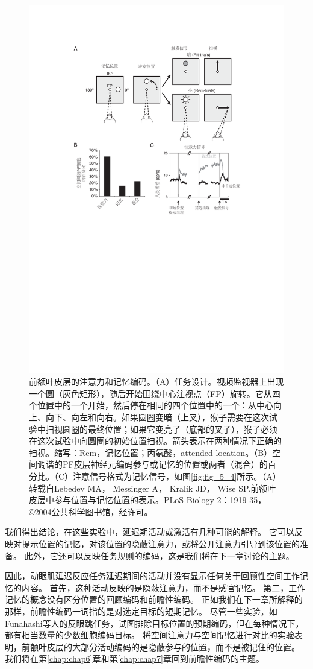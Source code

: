 \begin{figure}
	\centering
	\includegraphics[width=0.7\linewidth]{image_pfc/Fig_5_6}
	\caption{前额叶皮层的注意力和记忆编码。（A）任务设计。视频监视器上出现一个圆（灰色矩形），随后开始围绕中心注视点（FP）旋转。它从四个位置中的一个开始，然后停在相同的四个位置中的一个：从中心向上、向下、向左和向右。如果圆圈变暗（上叉），猴子需要在这次试验中扫视圆圈的最终位置；如果它变亮了（底部的叉子），猴子必须在这次试验中向圆圈的初始位置扫视。箭头表示在两种情况下正确的扫视。缩写：Rem，记忆位置；丙氨酸，attended-location。（B）空间调谐的PF皮层神经元编码参与或记忆的位置或两者（混合）的百分比。（C）注意信号格式为记忆信号，如图\ref{fig:fig_5_4}所示。（A）转载自Lebedev MA， Messinger A， Kralik JD， Wise SP.前额叶皮层中参与位置与记忆位置的表示。PLoS Biology 2：1919-35，©2004公共科学图书馆，经许可。}
	\label{fig:fig_5_6}
\end{figure}


我们得出结论，在这些实验中，延迟期活动或激活有几种可能的解释。
它可以反映对提示位置的记忆，对该位置的隐蔽注意力，或将公开注意力引导到该位置的准备。
此外，它还可以反映任务规则的编码，这是我们将在下一章讨论的主题。


因此，动眼肌延迟反应任务延迟期间的活动并没有显示任何关于回顾性空间工作记忆的内容。
首先，这种活动反映的是隐蔽注意力，而不是感官记忆。
第二，工作记忆的概念没有区分位置的回顾编码和前瞻性编码。
正如我们在下一章所解释的那样，前瞻性编码一词指的是对选定目标的短期记忆。
尽管一些实验，如Funahashi等人的反眼跳任务，试图排除目标位置的预期编码，但在每种情况下，都有相当数量的少数细胞编码目标。
将空间注意力与空间记忆进行对比的实验表明，前额叶皮层的大部分活动编码的是隐蔽参与的位置，而不是被记住的位置。
我们将在第\ref{chap:chap6}章和第\ref{chap:chap7}章回到前瞻性编码的主题。



